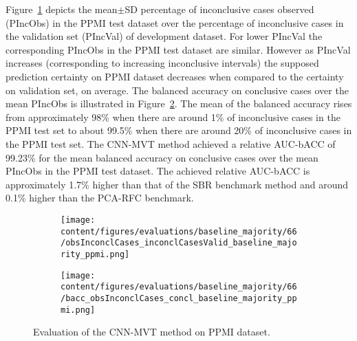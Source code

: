 Figure~\ref{fig:obsInconclCases_inconclCasesValid_baseline_majority_ppmi} depicts the
mean$\pm$SD percentage of inconclusive cases observed (PIncObs) in the PPMI test dataset 
over the percentage of inconclusive cases in the validation set (PIncVal) of development dataset.
For lower PIncVal the corresponding PIncObs in the PPMI test dataset are similar.
However as PIncVal increases (corresponding to increasing inconclusive intervals) 
the supposed prediction certainty on PPMI dataset decreases when compared to the certainty on validation set, on average.
The balanced accuracy on conclusive cases over the mean PIncObs is illustrated 
in Figure~\ref{fig:bacc_obsInconclCases_concl_baseline_majority_ppmi}.
The mean of the balanced accuracy rises from approximately 98\% 
when there are around 1\% of inconclusive cases in the PPMI test set to about 99.5\% 
when there are around 20\% of inconclusive cases in the PPMI test set.
The CNN-MVT method achieved a relative AUC-bACC of 99.23\% for the mean balanced accuracy on conclusive cases 
over the mean PIncObs in the PPMI test dataset.
The achieved relative AUC-bACC is approximately 1.7\% higher than that of the SBR benchmark method 
and around 0.1\% higher than the PCA-RFC benchmark.

\begin{figure}[ht]
  \begin{subfigure}{0.49\textwidth}
    \centering
    \texttt{[image: content/figures/evaluations/baseline\_majority/66/obsInconclCases\_inconclCasesValid\_baseline\_majority\_ppmi.png]}
    \label{fig:obsInconclCases_inconclCasesValid_baseline_majority_ppmi}
  \end{subfigure}
  \hfill
  \begin{subfigure}{0.49\textwidth}
    \centering
    \texttt{[image: content/figures/evaluations/baseline\_majority/66/bacc\_obsInconclCases\_concl\_baseline\_majority\_ppmi.png]}
    \label{fig:bacc_obsInconclCases_concl_baseline_majority_ppmi}
  \end{subfigure}
  \caption{Evaluation of the CNN-MVT method on PPMI dataset.}
  \label{fig:perf_results_mvt_ppmi}
\end{figure}


